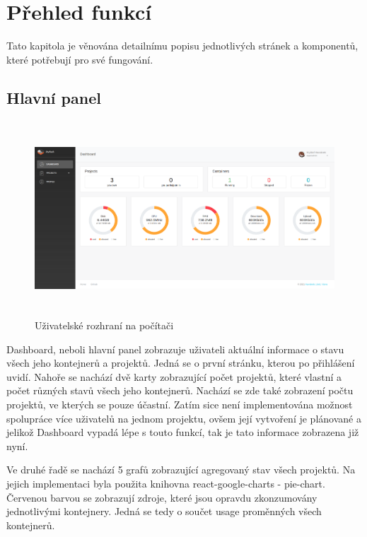 \documentclass[a4paper,oneside,12pt]{report}
\begin{document}
\section{Přehled funkcí}

Tato kapitola je věnována detailnímu popisu jednotlivých stránek a komponentů, které potřebují pro své fungování.

\subsection{Hlavní panel}

\begin{figure}[h]
	\centering
	\includegraphics[height=7.3cm]{../img/dashboard.png}
	\caption[Uživatelské rozhraní na počítači, vlastní tvorba]{Uživatelské rozhraní na počítači \linebreak}
	\label{fig:desktopRes}
\end{figure}

Dashboard, neboli hlavní panel zobrazuje uživateli aktuální informace o stavu všech jeho kontejnerů a projektů.
Jedná se o první stránku, kterou po přihlášení uvidí.
Nahoře se nachází dvě karty zobrazující počet projektů, které vlastní a počet různých stavů všech jeho kontejnerů.
Nachází se zde také zobrazení počtu projektů, ve kterých se pouze účastní.
Zatím sice není implementována možnost spolupráce více uživatelů na jednom projektu, ovšem její vytvoření je plánované a jelikož Dashboard vypadá lépe s touto funkcí, tak je tato informace zobrazena již nyní.

Ve druhé řadě se nachází 5 grafů zobrazující agregovaný stav všech projektů.
Na jejich implementaci byla použita knihovna react-google-charts - pie-chart.
Červenou barvou se zobrazují zdroje, které jsou opravdu zkonzumovány jednotlivými kontejnery.
Jedná se tedy o součet usage proměnných všech kontejnerů.
\end{document}
